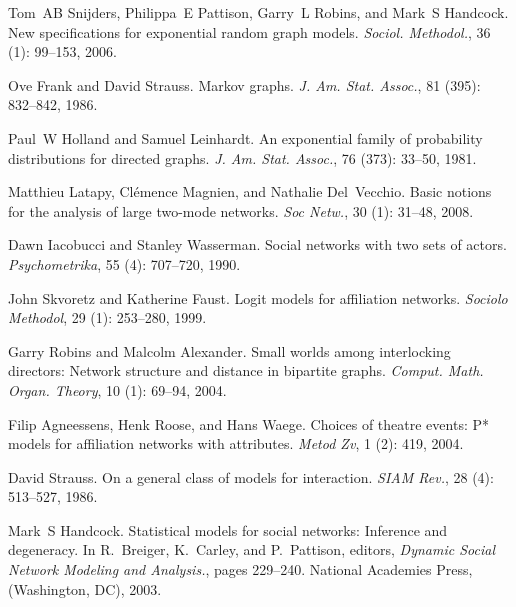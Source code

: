 Tom~AB Snijders, Philippa~E Pattison, Garry~L Robins, and Mark~S Handcock.
\newblock New specifications for exponential random graph models.
\newblock \emph{Sociol. Methodol.}, 36 (1): 99--153, 2006.

Ove Frank and David Strauss.
\newblock Markov graphs.
\newblock \emph{J. Am. Stat. Assoc.}, 81 (395): 832--842,
1986.

Paul~W Holland and Samuel Leinhardt.
\newblock An exponential family of probability distributions for directed
graphs.
\newblock \emph{J. Am. Stat. Assoc.}, 76 (373): 33--50, 1981.

Matthieu Latapy, Cl{\'e}mence Magnien, and Nathalie Del~Vecchio.
\newblock Basic notions for the analysis of large two-mode networks.
\newblock \emph{Soc Netw.}, 30 (1): 31--48, 2008.

Dawn Iacobucci and Stanley Wasserman.
\newblock Social networks with two sets of actors.
\newblock \emph{Psychometrika}, 55 (4): 707--720, 1990.

John Skvoretz and Katherine Faust.
\newblock Logit models for affiliation networks.
\newblock \emph{Sociolo Methodol}, 29 (1): 253--280, 1999.

Garry Robins and Malcolm Alexander.
\newblock Small worlds among interlocking directors: {{Network}} structure and
distance in bipartite graphs.
\newblock \emph{Comput. Math. Organ. Theory}, 10 (1): 69--94,
2004.

Filip Agneessens, Henk Roose, and Hans Waege.
\newblock Choices of theatre events: P* models for affiliation networks with
attributes.
\newblock \emph{Metod Zv}, 1 (2): 419, 2004.

David Strauss.
\newblock On a general class of models for interaction.
\newblock \emph{SIAM Rev.}, 28 (4): 513--527, 1986.

Mark~S Handcock.
\newblock Statistical models for social networks: {{Inference}} and degeneracy.
\newblock In R.~Breiger, K.~Carley, and P.~Pattison, editors, \emph{Dynamic
    Social Network Modeling and Analysis.}, pages 229--240. {National Academies
    Press, (Washington, DC)}, 2003.

